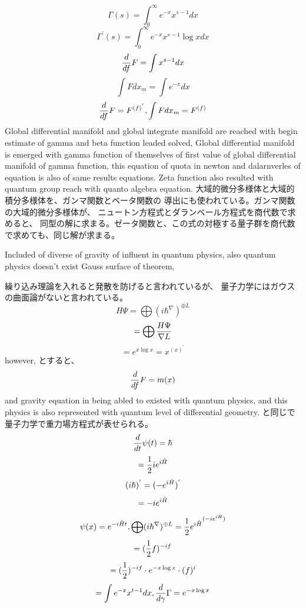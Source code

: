 \documentclass{jsarticle}
\begin{document}
    $$ \Gamma(s) = \int^{\infty}_{0} e^{-x}x^{s - 1}dx $$
    $$  \Gamma^{'}(s) = \int^{\infty}_{0} e^{-x}x^{s - 1} \log x dx $$
    $$ {d \over df}F = \int x^{s - 1}dx $$
    $$ \int F dx_m = \int e^{-x}dx $$
    $$ {d \over df}F = F^{(f)^{'}}, \int F dx_m = F^{(f)} $$
    Global differential manifold and global integrate manifold are
    reached with begin estimate of gamma and beta function leaded solved,
    Global differential manifold is emerged with gamma function of
    themselves of first value of global differential manifold of gamma
    function, this equation of quota in newton and dalarnverles of equation
    is also of same results equations. Zeta function also resulted with
    quantum group reach with quanto algebra equation.
    大域的微分多様体と大域的積分多様体を、ガンマ関数とベータ関数の
    導出にも使われている。ガンマ関数の大域的微分多様体が、
    ニュートン方程式とダランベール方程式を商代数で求めると、
    同型の解に求まる。ゼータ関数と、この式の対極する量子群を商代数
    で求めても、同じ解が求まる。

    Included of diverse of gravity of influent in quantum physics,
    also quantum physics doesn't exist Gauss surface of theorem,
   
    繰り込み理論を入れると発散を防げると言われているが、
    量子力学にはガウスの曲面論がないと言われている。
    $$ H \Psi = \bigoplus (i \hbar ^{\nabla})^{\oplus L} $$
    $$ = \bigoplus {{ H \Psi} \over \nabla L} $$
    $$ = e^{x \log x} = x^{(x)^{'}} $$
    however,
    とすると、
    $$ {d \over df}F = m(x) $$
    and gravity equation in being abled to existed with quantum physics,
    and this physics is also represented with quantum level of differential
    geometry.
    と同じで量子力学で重力場方程式が表せられる。
    $$ {d \over dt}\psi(t) = \hbar $$
    $$ = {1 \over 2}i e^{i \Hat{H}} $$
    $$ (i \hbar)^{'} = (- e^{i \Hat{H}})^{'} $$
    $$ = - i e^{i \Hat{H}} $$
    $$ \psi(x) = e^{-i \Hat{H}t}, \bigoplus (i \hbar ^{\nabla})^{\oplus L} 
    = {{{1 \over 2} e^{i \Hat{H}}}^{(-i e^{i \Hat{H}})}} $$
    $$ = ({1 \over 2}f)^{-i f}$$
    $$ = ({1 \over 2})^{-i f} \cdot e^{-x \log x} \cdot (f)^{i} $$
    $$ = \int e^{- x} x^{t - 1}dx, {d \over d \gamma}\Gamma = e^{-x \log x}  $$
     
\end{document}
